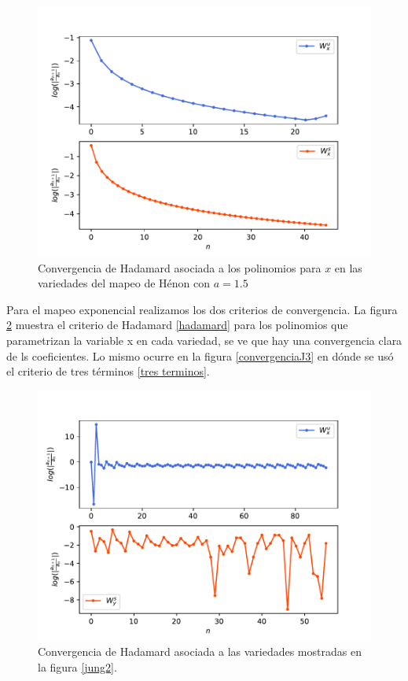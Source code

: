 \begin{figure}[H]
\centering
\includegraphics[scale=0.5]{converHenon1}
\caption{Convergencia de Hadamard asociada a los polinomios para $x$ en las variedades del mapeo de Hénon con $a=1.5$}
\label{convergenciaHenon1}
\end{figure}


Para el mapeo exponencial realizamos los dos criterios de convergencia. La figura \ref{convergenciaJH} muestra el criterio de Hadamard \ref{hadamard} para los polinomios que parametrizan la variable x en cada variedad, se ve que hay una convergencia clara de ls coeficientes. Lo mismo ocurre en la figura \ref{convergenciaJ3} en dónde se usó el criterio de tres términos \ref{tres terminos}.

\begin{figure}[H]
\centering
\includegraphics[scale=0.5]{convergenciaJungH57}
\caption{Convergencia de Hadamard asociada a las variedades mostradas en la figura \ref{jung2}.}
\label{convergenciaJH}
\end{figure}


